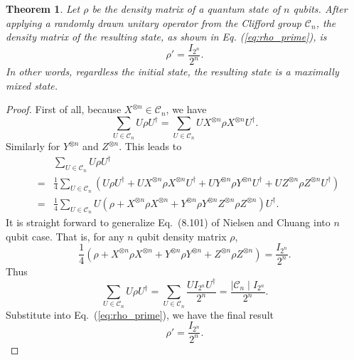 \documentclass{article}
\newtheorem{theorem}{Theorem}
\begin{document}
\begin{theorem}
  Let $\rho$ be the density matrix of a quantum state of $n$ qubits.
  After applying a randomly drawn unitary operator from the Clifford group
  $\mathcal C_n$, the density matrix of the resulting state, as shown in
  Eq. (\ref{eq:rho_prime}), is
  \begin{equation}
    \rho' = \frac{I_{2^n}}{2^n}.
  \end{equation}
  In other words, regardless the initial state, the resulting state is a
  maximally mixed state.
\end{theorem}
\begin{proof}
  First of all, because $X^{\otimes n}\in\mathcal C_n$, we have
  \begin{equation}
    \sum_{U\in\mathcal C_n} U\rho U^\dagger =
    \sum_{U\in\mathcal C_n} UX^{\otimes n}\rho X^{\otimes n}U^\dagger.
  \end{equation}
  Similarly for $Y^{\otimes n}$ and $Z^{\otimes n}$. This leads to
  \begin{eqnarray}
    &   & \sum_{U\in\mathcal C_n} U\rho U^\dagger \nonumber \\
    & = & \frac14\sum_{U\in\mathcal C_n}\left(U\rho U^\dagger +
    UX^{\otimes n}\rho X^{\otimes n}U^\dagger +
    UY^{\otimes n}\rho Y^{\otimes n}U^\dagger +
    UZ^{\otimes n}\rho Z^{\otimes n}U^\dagger\right)
    \nonumber \\
    & = & \frac14\sum_{U\in\mathcal C_n}U\left(
    \rho + X^{\otimes n}\rho X^{\otimes n} + Y^{\otimes n}\rho Y^{\otimes n}
    Z^{\otimes n}\rho Z^{\otimes n} \right)U^\dagger.
  \end{eqnarray}
  It is straight forward to generalize Eq.~(8.101) of 
  Nielsen and Chuang\cite{Nielsen_Chuang_2010} into $n$ qubit case.
  That is, for any $n$ qubit density matrix $\rho$,
  \begin{equation}
    \frac14\left(\rho + X^{\otimes n}\rho X^{\otimes n}
    + Y^{\otimes n}\rho Y^{\otimes n} + Z^{\otimes n}\rho Z^{\otimes n}\right)
    = \frac{I_{2^n}}{2^n}.
  \end{equation}
  Thus
  \begin{equation}
    \sum_{U\in\mathcal C_n}U\rho U^\dagger
    = \sum_{U\in\mathcal C_n}\frac{UI_{2^n}U^\dagger}{2^n}
    = \frac{\mid\mathcal C_n\mid I_{2^n}}{2^n}.
  \end{equation}
  Substitute into Eq.~(\ref{eq:rho_prime}), we have the final result
  \begin{equation}
    \rho' = \frac{I_{2^n}}{2^n}.
  \end{equation}
\end{proof}




\end{document}
